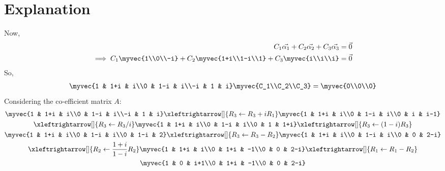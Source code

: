 \documentclass[journal,12pt,twocolumn]{IEEEtran}
\begin{document}
\section{Explanation}
Now,
\begin{align}
C_1 \vec{\alpha_1} +C_2 \vec{\alpha_2}+C_3 \vec{\alpha_3} = \vec{0}\\
\implies C_1 \myvec{1\\0\\-i}+ C_2\myvec{1+i\\1-i\\1} + C_3\myvec{i\\i\\i} = \vec{0}
\end{align}
So,
\begin{align}
\myvec{1 & 1+i & i\\0 & 1-i & i\\-i & 1 & i}\myvec{C_1\\C_2\\C_3} = \myvec{0\\0\\0}
\end{align}
Considering the co-efficient matrix $A$:
\begin{multline}
\myvec{1 & 1+i & i\\0 & 1-i & i\\-i & 1 & i}\xleftrightarrow[]{R_3\leftarrow R_3+iR_1}\myvec{1 & 1+i & i\\0 & 1-i & i\\0 & i & i-1}\\
\xleftrightarrow[]{R_3\leftarrow R_3/i}\myvec{1 & 1+i & i\\0 & 1-i & i\\0 & 1 & 1+i}\xleftrightarrow[]{R_3\leftarrow (1-i)R_3}\\
\myvec{1 & 1+i & i\\0 & 1-i & i\\0 & 1-i & 2}\xleftrightarrow[]{R_3\leftarrow R_3-R_2}\myvec{1 & 1+i & i\\0 & 1-i & i\\0 & 0 & 2-i}\\
\xleftrightarrow[]{R_2\leftarrow \frac{1+i}{1-i}R_2}\myvec{1 & 1+i & i\\0 & 1+i & -1\\0 & 0 & 2-i}\xleftrightarrow[]{R_1\leftarrow R_1-R_2}\\
\myvec{1 & 0 & i+1\\0 & 1+i & -1\\0 & 0 & 2-i}
\end{multline}
\end{document}
